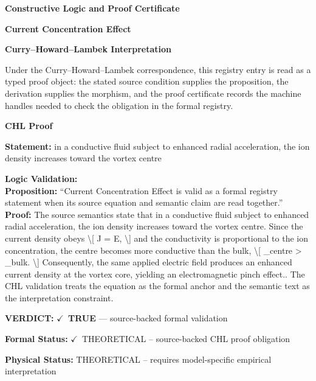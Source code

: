 \clearpage
\begingroup\tzpsupportsetup
\noindent\textbf{\fontsize{10.8pt}{12.8pt}\selectfont [ID 0125] Constructive Logic and Proof Certificate}\par
\noindent\textbf{\fontsize{10pt}{12pt}\selectfont Current Concentration Effect}\par
\vspace{0.45em}
\begingroup
\footnotesize
\setlength{\parskip}{0.22em}
\setlength{\parindent}{0pt}
\noindent\textbf{Curry--Howard--Lambek Interpretation}\par
Under the Curry--Howard--Lambek correspondence, this registry entry is read as a typed proof
object: the stated source condition supplies the proposition, the derivation supplies the
morphism, and the proof certificate records the machine handles needed to check the obligation
in the formal registry.

\vspace{0.45em}
\noindent\textbf{CHL Proof}\par
\textbf{Statement:} in a conductive fluid subject to enhanced radial acceleration, the ion density increases
toward the vortex centre

\textbf{Logic Validation:}\\
\textbf{Proposition:} ``Current Concentration Effect is valid as a formal registry statement when its source
equation and semantic claim are read together.''\\
\textbf{Proof:} The source semantics state that in a conductive fluid subject to enhanced radial
acceleration, the ion density increases toward the vortex centre. Since the current
density obeys \textbackslash{}[ J = E, \textbackslash{}] and the conductivity  is proportional to the ion
concentration, the centre becomes more conductive than the bulk, \textbackslash{}[ \_centre > \_bulk. \textbackslash{}]
Consequently, the same applied electric field produces an enhanced current density at
the vortex core, yielding an electromagnetic pinch effect.. The CHL validation treats
the equation as the formal anchor and the semantic text as the interpretation
constraint.

\textbf{VERDICT:} \ensuremath{\checkmark}\ \textbf{TRUE} --- source-backed formal validation

\textbf{Formal Status:} \ensuremath{\checkmark}\ THEORETICAL -- source-backed CHL proof obligation

\textbf{Physical Status:} THEORETICAL -- requires model-specific empirical interpretation
\par\vspace{0.45em}
\par
\ifTZPDarkEdition
{}
\fi
\endgroup
\endgroup

